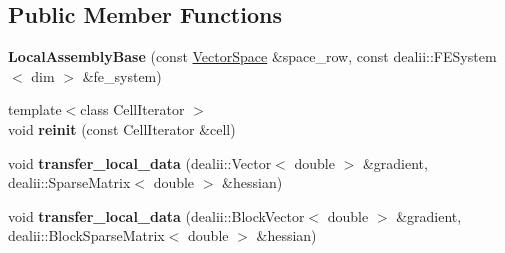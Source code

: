 \subsection*{Public Member Functions}
\begin{DoxyCompactItemize}
\item 
\hypertarget{structSpacy_1_1dealII_1_1Detail_1_1LocalAssemblyBase_aea08f1b645953375d53b02b14f3f89a5}{{\bfseries Local\-Assembly\-Base} (const \hyperlink{classSpacy_1_1VectorSpace}{Vector\-Space} \&space\-\_\-row, const dealii\-::\-F\-E\-System$<$ dim $>$ \&fe\-\_\-system)}\label{structSpacy_1_1dealII_1_1Detail_1_1LocalAssemblyBase_aea08f1b645953375d53b02b14f3f89a5}

\item 
\hypertarget{structSpacy_1_1dealII_1_1Detail_1_1LocalAssemblyBase_aa626f61838942e829ecd56bcdf00eb36}{{\footnotesize template$<$class Cell\-Iterator $>$ }\\void {\bfseries reinit} (const Cell\-Iterator \&cell)}\label{structSpacy_1_1dealII_1_1Detail_1_1LocalAssemblyBase_aa626f61838942e829ecd56bcdf00eb36}

\item 
\hypertarget{structSpacy_1_1dealII_1_1Detail_1_1LocalAssemblyBase_a2ed527f94c932b8277010186d3ad1a8d}{void {\bfseries transfer\-\_\-local\-\_\-data} (dealii\-::\-Vector$<$ double $>$ \&gradient, dealii\-::\-Sparse\-Matrix$<$ double $>$ \&hessian)}\label{structSpacy_1_1dealII_1_1Detail_1_1LocalAssemblyBase_a2ed527f94c932b8277010186d3ad1a8d}

\item 
\hypertarget{structSpacy_1_1dealII_1_1Detail_1_1LocalAssemblyBase_a0fa5b7e2be1fbeb8e26f0ea3e755cdd3}{void {\bfseries transfer\-\_\-local\-\_\-data} (dealii\-::\-Block\-Vector$<$ double $>$ \&gradient, dealii\-::\-Block\-Sparse\-Matrix$<$ double $>$ \&hessian)}\label{structSpacy_1_1dealII_1_1Detail_1_1LocalAssemblyBase_a0fa5b7e2be1fbeb8e26f0ea3e755cdd3}

\end{DoxyCompactItemize}
